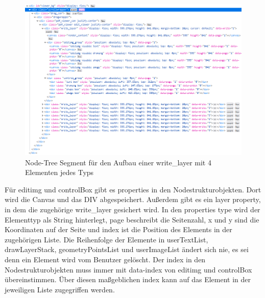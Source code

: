 \begin{figure}[!htbp]
	\centering
	\includegraphics[width=1\textwidth]{"images/write-layer.png"}
	\caption{Node-Tree Segment für den Aufbau einer write\_layer mit 4 Elementen jedes Typs}
	\label{fig:write-layer}
\end{figure}

Für editimg und controlBox gibt es properties in den Nodestrukturobjekten. Dort wird die Canvas und das DIV abgespeichert. Außerdem gibt es ein layer property, in dem die zugehörige write\_layer gesichert wird. In den properties type wird der Elementtyp als String hinterlegt, page beschreibt die Seitenzahl, x und y sind die Koordinaten auf der Seite und index ist die Position des Elements in der zugehörigen Liste. Die Reihenfolge der Elemente in userTextList, drawLayerStack, geometryPointsList und userImageList ändert sich nie, es sei denn ein Element wird vom Benutzer gelöscht. Der index in den Nodestrukturobjekten muss immer mit data-index von editimg und controlBox übereinstimmen. Über diesen maßgeblichen index kann auf das Element in der jeweiligen Liste zugegriffen werden.


